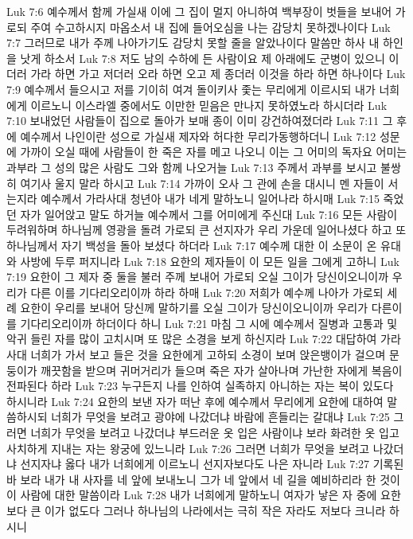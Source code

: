 Luk 7:6  예수께서 함께 가실새 이에 그 집이 멀지 아니하여 백부장이 벗들을 보내어 가로되 주여 수고하시지 마옵소서 내 집에 들어오심을 나는 감당치 못하겠나이다
Luk 7:7  그러므로 내가 주께 나아가기도 감당치 못할 줄을 알았나이다 말씀만 하사 내 하인을 낫게 하소서
Luk 7:8  저도 남의 수하에 든 사람이요 제 아래에도 군병이 있으니 이더러 가라 하면 가고 저더러 오라 하면 오고 제 종더러 이것을 하라 하면 하나이다
Luk 7:9  예수께서 들으시고 저를 기이히 여겨 돌이키사 좇는 무리에게 이르시되 내가 너희에게 이르노니 이스라엘 중에서도 이만한 믿음은 만나지 못하였노라 하시더라
Luk 7:10  보내었던 사람들이 집으로 돌아가 보매 종이 이미 강건하여졌더라
Luk 7:11  그 후에 예수께서 나인이란 성으로 가실새 제자와 허다한 무리가동행하더니
Luk 7:12  성문에 가까이 오실 때에 사람들이 한 죽은 자를 메고 나오니 이는 그 어미의 독자요 어미는 과부라 그 성의 많은 사람도 그와 함께 나오거늘
Luk 7:13  주께서 과부를 보시고 불쌍히 여기사 울지 말라 하시고
Luk 7:14  가까이 오사 그 관에 손을 대시니 멘 자들이 서는지라 예수께서 가라사대 청년아 내가 네게 말하노니 일어나라 하시매
Luk 7:15  죽었던 자가 일어앉고 말도 하거늘 예수께서 그를 어미에게 주신대
Luk 7:16  모든 사람이 두려워하며 하나님께 영광을 돌려 가로되 큰 선지자가 우리 가운데 일어나셨다 하고 또 하나님께서 자기 백성을 돌아 보셨다 하더라
Luk 7:17  예수께 대한 이 소문이 온 유대와 사방에 두루 퍼지니라
Luk 7:18  요한의 제자들이 이 모든 일을 그에게 고하니
Luk 7:19  요한이 그 제자 중 둘을 불러 주께 보내어 가로되 오실 그이가 당신이오니이까 우리가 다른 이를 기다리오리이까 하라 하매
Luk 7:20  저희가 예수께 나아가 가로되 세례 요한이 우리를 보내어 당신께 말하기를 오실 그이가 당신이오니이까 우리가 다른이를 기다리오리이까 하더이다 하니
Luk 7:21  마침 그 시에 예수께서 질병과 고통과 및 악귀 들린 자를 많이 고치시며 또 많은 소경을 보게 하신지라
Luk 7:22  대답하여 가라사대 너희가 가서 보고 들은 것을 요한에게 고하되 소경이 보며 앉은뱅이가 걸으며 문둥이가 깨끗함을 받으며 귀머거리가 들으며 죽은 자가 살아나며 가난한 자에게 복음이 전파된다 하라
Luk 7:23  누구든지 나를 인하여 실족하지 아니하는 자는 복이 있도다 하시니라
Luk 7:24  요한의 보낸 자가 떠난 후에 예수께서 무리에게 요한에 대하여 말씀하시되 너희가 무엇을 보려고 광야에 나갔더냐 바람에 흔들리는 갈대냐
Luk 7:25  그러면 너희가 무엇을 보려고 나갔더냐 부드러운 옷 입은 사람이냐 보라 화려한 옷 입고 사치하게 지내는 자는 왕궁에 있느니라
Luk 7:26  그러면 너희가 무엇을 보려고 나갔더냐 선지자냐 옳다 내가 너희에게 이르노니 선지자보다도 나은 자니라
Luk 7:27  기록된바 보라 내가 내 사자를 네 앞에 보내노니 그가 네 앞에서 네 길을 예비하리라 한 것이 이 사람에 대한 말씀이라
Luk 7:28  내가 너희에게 말하노니 여자가 낳은 자 중에 요한보다 큰 이가 없도다 그러나 하나님의 나라에서는 극히 작은 자라도 저보다 크니라 하시니
